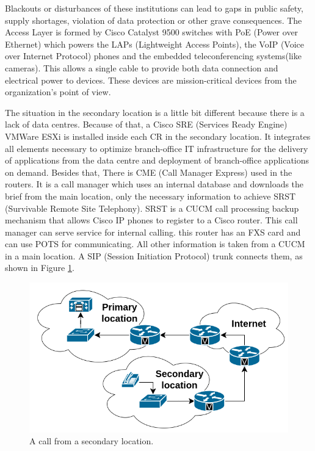 \documentclass{article}
\begin{document}
Blackouts or disturbances of these institutions can lead to gaps in public safety, supply shortages, violation of data protection or other grave consequences. The Access Layer is formed by Cisco Catalyst 9500 switches with PoE (Power over Ethernet) which powers the LAPs (Lightweight Access Points), the VoIP (Voice over Internet Protocol) phones and the embedded teleconferencing systems(like cameras). This allows a single cable to provide both data connection and electrical power to devices. These devices are mission-critical devices from the organization's point of view.

The situation in the secondary location is a little bit different because there is a lack of data centres. Because of that, a Cisco SRE (Services Ready Engine)\cite{SRE} VMWare ESXi is installed inside each CR in the secondary location. It integrates all elements necessary to optimize branch-office IT infrastructure for the delivery of applications from the data centre and deployment of branch-office applications on demand. Besides that, There is CME (Call Manager Express) used in the routers. It is a call manager which uses an internal database and downloads the brief from the main location, only the necessary information to achieve SRST (Survivable Remote Site Telephony)\cite{SRST}. SRST is a CUCM call processing backup mechanism that allows Cisco IP phones to register to a Cisco router. This call manager can serve service for internal calling. this router has an FXS card and can use POTS for communicating. All other information is taken from a CUCM in a main location. A SIP (Session Initiation Protocol) trunk connects them, as shown in Figure \ref{fig:secondary_call}.

\begin{figure}
\centering
\includegraphics[width=1\textwidth]{secondary_call.png}
\caption{\label{fig:secondary_call}A call from a secondary location.}
\end{figure}
\end{document}
